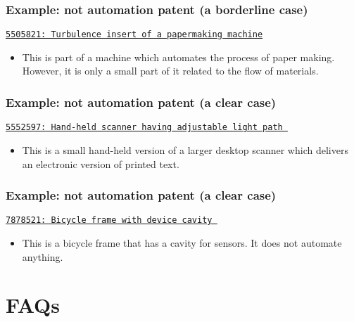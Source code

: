 \documentclass[10pt]{beamer}
\begin{document}
\begin{frame}\frametitle{Example: \textbf{not} automation patent (a borderline case)}
\href{https://www.google.de/patents/US5505821?dq=5505821&hl=en&sa=X&ei=DvRRVbmqEomrsAHtxIE4&ved=0CCEQ6AEwAA}{\texttt{5505821: Turbulence insert of a papermaking machine}}
	\begin{itemize}	
	\item This is part of a machine which automates the process of paper making. However, it is only a small part of it related to the flow of materials.
	\end{itemize}
\end{frame}


\begin{frame}\frametitle{Example: \textbf{not} automation patent (a clear case)}
\href{https://www.google.de/patents/US5552597?dq=5552597&hl=en&sa=X&ei=mvtRVYXNNomjsAHFi4GYBw&ved=0CCEQ6AEwAA}{\texttt{5552597: Hand-held scanner having adjustable light path }}
	\begin{itemize}	
	\item This is a small hand-held version of a larger desktop scanner which delivers an electronic version of printed text. 
	\end{itemize}
\end{frame}


\begin{frame}\frametitle{Example: \textbf{not} automation patent (a clear case)}
\href{https://www.google.de/patents/US7878521?dq=7878521&hl=en&sa=X&ei=VfZRVe_QMsGzswHZtYHwDA&ved=0CCEQ6AEwAA}{\texttt{7878521: Bicycle frame with device cavity }}
	\begin{itemize}	
	\item This is a bicycle frame that has a cavity for sensors. It does not automate anything.
	\end{itemize}
\end{frame}








\section{FAQs}
\setcounter{subsection}{1} %
\end{document}
